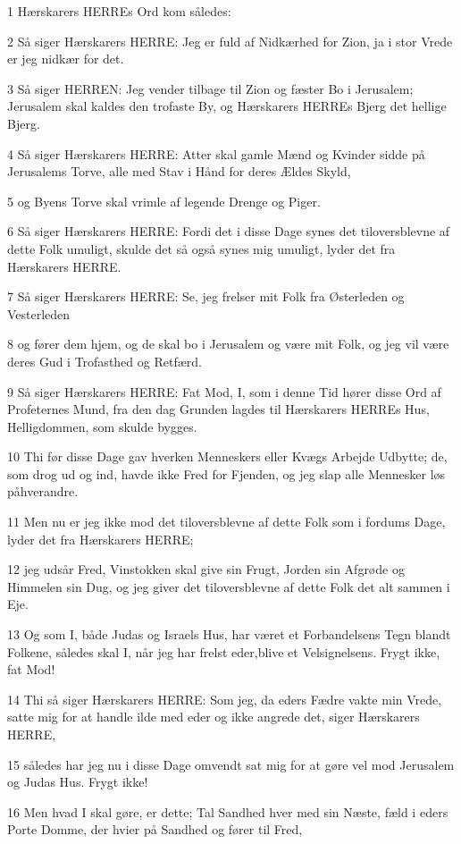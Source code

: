 \par 1 Hærskarers HERREs Ord kom således:
\par 2 Så siger Hærskarers HERRE: Jeg er fuld af Nidkærhed for Zion, ja i stor Vrede er jeg nidkær for det.
\par 3 Så siger HERREN: Jeg vender tilbage til Zion og fæster Bo i Jerusalem; Jerusalem skal kaldes den trofaste By, og Hærskarers HERREs Bjerg det hellige Bjerg.
\par 4 Så siger Hærskarers HERRE: Atter skal gamle Mænd og Kvinder sidde på Jerusalems Torve, alle med Stav i Hånd for deres Ældes Skyld,
\par 5 og Byens Torve skal vrimle af legende Drenge og Piger.
\par 6 Så siger Hærskarers HERRE: Fordi det i disse Dage synes det tiloversblevne af dette Folk umuligt, skulde det så også synes mig umuligt, lyder det fra Hærskarers HERRE.
\par 7 Så siger Hærskarers HERRE: Se, jeg frelser mit Folk fra Østerleden og Vesterleden
\par 8 og fører dem hjem, og de skal bo i Jerusalem og være mit Folk, og jeg vil være deres Gud i Trofasthed og Retfærd.
\par 9 Så siger Hærskarers HERRE: Fat Mod, I, som i denne Tid hører disse Ord af Profeternes Mund, fra den dag Grunden lagdes til Hærskarers HERREs Hus, Helligdommen, som skulde bygges.
\par 10 Thi før disse Dage gav hverken Menneskers eller Kvægs Arbejde Udbytte; de, som drog ud og ind, havde ikke Fred for Fjenden, og jeg slap alle Mennesker løs påhverandre.
\par 11 Men nu er jeg ikke mod det tiloversblevne af dette Folk som i fordums Dage, lyder det fra Hærskarers HERRE;
\par 12 jeg udsår Fred, Vinstokken skal give sin Frugt, Jorden sin Afgrøde og Himmelen sin Dug, og jeg giver det tiloversblevne af dette Folk det alt sammen i Eje.
\par 13 Og som I, både Judas og Israels Hus, har været et Forbandelsens Tegn blandt Folkene, således skal I, når jeg har frelst eder,blive et Velsignelsens. Frygt ikke, fat Mod!
\par 14 Thi så siger Hærskarers HERRE: Som jeg, da eders Fædre vakte min Vrede, satte mig for at handle ilde med eder og ikke angrede det, siger Hærskarers HERRE,
\par 15 således har jeg nu i disse Dage omvendt sat mig for at gøre vel mod Jerusalem og Judas Hus. Frygt ikke!
\par 16 Men hvad I skal gøre, er dette; Tal Sandhed hver med sin Næste, fæld i eders Porte Domme, der hvier på Sandhed og fører til Fred,
